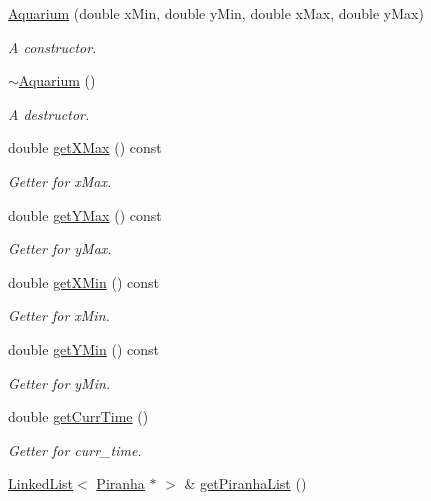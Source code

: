 \begin{DoxyCompactItemize}
\item 
\mbox{\hyperlink{class_aquarium_abd216182838b8edad8626a580e6e99e1}{Aquarium}} (double x\+Min, double y\+Min, double x\+Max, double y\+Max)
\begin{DoxyCompactList}\small\item\em A constructor. \end{DoxyCompactList}\item 
\mbox{\hyperlink{class_aquarium_a40f31f27104d48e4f558d40059f4a590}{$\sim$\+Aquarium}} ()
\begin{DoxyCompactList}\small\item\em A destructor. \end{DoxyCompactList}\item 
double \mbox{\hyperlink{class_aquarium_af0b5f88a7aaf71e817f809d7bee3e51e}{get\+X\+Max}} () const
\begin{DoxyCompactList}\small\item\em Getter for x\+Max. \end{DoxyCompactList}\item 
double \mbox{\hyperlink{class_aquarium_a13893ca5240c99792040a7a64fd80bf5}{get\+Y\+Max}} () const
\begin{DoxyCompactList}\small\item\em Getter for y\+Max. \end{DoxyCompactList}\item 
double \mbox{\hyperlink{class_aquarium_a3e9e4b1bc86a90a8654bcc76e20e25f1}{get\+X\+Min}} () const
\begin{DoxyCompactList}\small\item\em Getter for x\+Min. \end{DoxyCompactList}\item 
double \mbox{\hyperlink{class_aquarium_ad5ef328047a3a0815b32764f7114fbea}{get\+Y\+Min}} () const
\begin{DoxyCompactList}\small\item\em Getter for y\+Min. \end{DoxyCompactList}\item 
double \mbox{\hyperlink{class_aquarium_aae7158daf192a78ffaf165285386221f}{get\+Curr\+Time}} ()
\begin{DoxyCompactList}\small\item\em Getter for curr\+\_\+time. \end{DoxyCompactList}\item 
\mbox{\hyperlink{class_linked_list}{Linked\+List}}$<$ \mbox{\hyperlink{class_piranha}{Piranha}} $\ast$ $>$ \& \mbox{\hyperlink{class_aquarium_a46c1697b25884c5a91f7a942ae5b3ba7}{get\+Piranha\+List}} ()

\end{DoxyCompactItemize}
